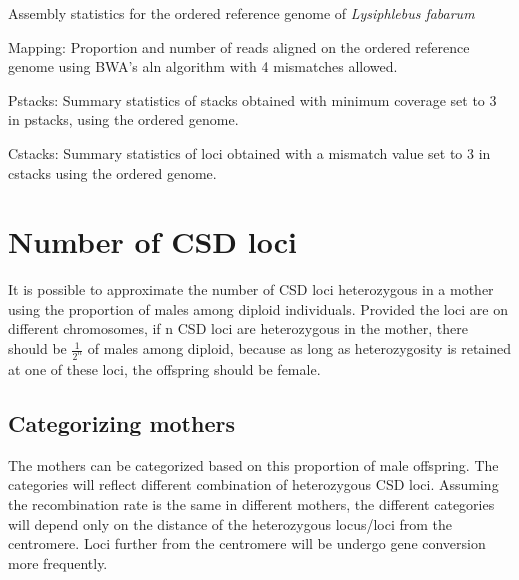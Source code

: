 \documentclass[10pt,a4paper]{report}
\begin{document}
\begin{table}[h]
\caption{Assembly statistics for the ordered reference genome of \textit{Lysiphlebus fabarum}}
\label{assembly_stats_ordered}
\end{table}

\begin{table}[h]
\caption{Mapping: Proportion and number of reads aligned on the ordered reference genome using BWA's aln algorithm with 4 mismatches allowed.}
\label{mapping_stats}
\end{table}

\begin{table}
\caption{Pstacks: Summary statistics of stacks obtained with minimum coverage set to 3 in pstacks, using the ordered genome.}
\label{pstacks_ordered}
\end{table}

\begin{table}
\caption{Cstacks: Summary statistics of loci obtained with a mismatch value set to 3 in cstacks using the ordered genome.}
\label{cstacks_ordered}
\end{table}

\FloatBarrier

\chapter{Number of CSD loci}
\label{sec:num_csd}

It is possible to approximate the number of CSD loci heterozygous in a mother using the proportion of males among diploid individuals. Provided the loci are on different chromosomes, if n CSD loci are heterozygous in the mother, there should be $\frac{1}{2^n}$ of males among diploid, because as long as heterozygosity is retained at one of these loci, the offspring should be female.

\section{Categorizing mothers}
\label{sec:cat_mothers}
The mothers can be categorized based on this proportion of male offspring. The categories will reflect different combination of heterozygous CSD loci. Assuming the recombination rate is the same in different mothers, the different categories will depend only on the distance of the heterozygous locus/loci from the centromere. Loci further from the centromere will be undergo gene conversion more frequently.
\end{document}

